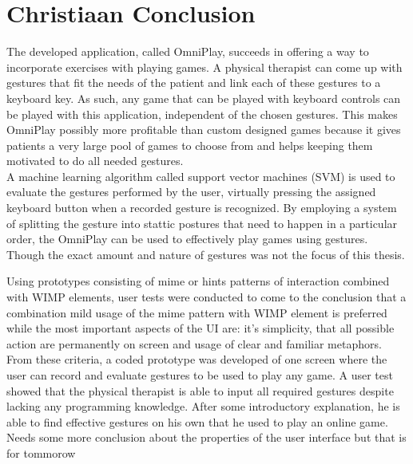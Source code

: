 \chapter{Christiaan Conclusion}

The developed application, called OmniPlay, succeeds in offering a way to incorporate exercises with playing games. A physical therapist can come up with gestures that fit the needs of the patient and link each of these gestures to a keyboard key. As such, any game that can be played with keyboard controls can be played with this application, independent of the chosen gestures. This makes OmniPlay possibly more profitable than custom designed games because it gives patients a very large pool of games to choose from and helps keeping them motivated to do all needed gestures.\\

A machine learning algorithm called support vector machines (SVM) is used to evaluate the gestures performed by the user, virtually pressing the assigned keyboard button when a recorded gesture is recognized. By employing a system of splitting the gesture into stattic postures that need to happen in a particular order, the OmniPlay can be used to effectively play games using gestures. Though the exact amount and nature of gestures was not the focus of this thesis.

Using prototypes consisting of mime or hints patterns of interaction combined with WIMP elements, user tests were conducted to come to the conclusion that a combination mild usage of the mime pattern with WIMP element is preferred while the most important aspects of the UI are: it's simplicity, that all possible action are permanently on screen and usage of clear and familiar metaphors. From these criteria, a coded prototype was developed of one screen where the user can record and evaluate gestures to be used to play any game. A user test showed that the physical therapist is able to input all required gestures despite lacking any programming knowledge. After some introductory explanation, he is able to find effective gestures on his own that he used to play an online game.  \\


Needs some more conclusion about the properties of the user interface but that is for tommorow